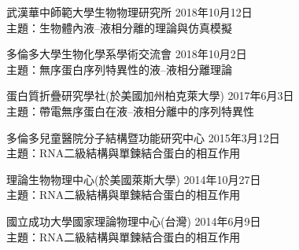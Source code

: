 \documentclass[11pt,letterpaper, sans]{article}
\begin{document}
\begin{flushleft}
\begin{etaremune}[leftmargin=17pt]
\item 武漢華中師範大學生物物理研究所 \hfill 2018年10月12日\\
主題：生物體內液--液相分離的理論與仿真模擬


\item 多倫多大學生物化學系學術交流會 \hfill 2018年10月2日 \\
主題：無序蛋白序列特異性的液--液相分離理論

\item 蛋白質折疊研究學社(於美國加州柏克萊大學) \hfill 2017年6月3日 \\
主題：帶電無序蛋白在液--液相分離中的序列特異性

\item 多倫多兒童醫院分子結構暨功能研究中心 \hfill 2015年3月12日 \\
主題：RNA二級結構與單鍊結合蛋白的相互作用

\item 理論生物物理中心(於美國萊斯大學) \hfill 2014年10月27日 \\
主題：RNA二級結構與單鍊結合蛋白的相互作用

\item 國立成功大學國家理論物理中心(台灣) \hfill 2014年6月9日 \\
主題：RNA二級結構與單鍊結合蛋白的相互作用


\end{etaremune} 


\end{flushleft}

\bigskip
\end{document}
